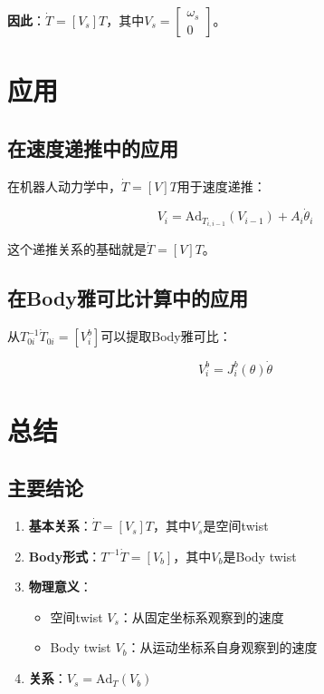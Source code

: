 \documentclass[12pt,a4paper]{article}
\begin{document}
\textbf{因此}：$\dot{T} = [V_s]T$，其中$V_s = \begin{bmatrix} \omega_s \\ 0 \end{bmatrix}$。

\section{应用}

\subsection{在速度递推中的应用}

在机器人动力学中，$\dot{T} = [V]T$用于速度递推：

\begin{equation}
V_i = \text{Ad}_{T_{i,i-1}}(V_{i-1}) + A_i \dot{\theta}_i
\end{equation}

这个递推关系的基础就是$\dot{T} = [V]T$。

\subsection{在Body雅可比计算中的应用}

从$T_{0i}^{-1}\dot{T}_{0i} = [V_i^b]$可以提取Body雅可比：

\begin{equation}
V_i^b = J_i^b(\theta) \dot{\theta}
\end{equation}

\section{总结}

\subsection{主要结论}

\begin{enumerate}
\item \textbf{基本关系}：$\dot{T} = [V_s]T$，其中$V_s$是空间twist

\item \textbf{Body形式}：$T^{-1}\dot{T} = [V_b]$，其中$V_b$是Body twist

\item \textbf{物理意义}：
\begin{itemize}
\item 空间twist $V_s$：从固定坐标系观察到的速度
\item Body twist $V_b$：从运动坐标系自身观察到的速度
\end{itemize}

\item \textbf{关系}：$V_s = \text{Ad}_T(V_b)$
\end{enumerate}
\end{document}

